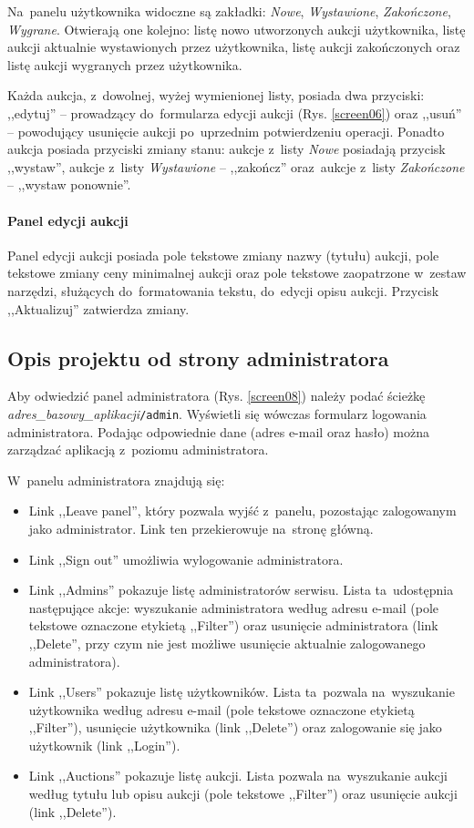 Na~panelu użytkownika widoczne są zakładki: \textit{Nowe}, \textit{Wystawione}, \textit{Zakończone}, \textit{Wygrane}. Otwierają one kolejno: listę nowo utworzonych aukcji użytkownika, listę aukcji aktualnie wystawionych przez użytkownika, listę aukcji zakończonych oraz listę aukcji wygranych przez użytkownika.


Każda aukcja, z~dowolnej, wyżej wymienionej listy, posiada dwa przyciski: ,,edytuj'' -- prowadzący do~formularza edycji aukcji (Rys. \ref{screen06}) oraz ,,usuń'' -- powodujący usunięcie aukcji po~uprzednim potwierdzeniu operacji. Ponadto aukcja posiada przyciski zmiany stanu: aukcje z~listy \textit{Nowe} posiadają przycisk ,,wystaw'', aukcje z~listy \textit{Wystawione} -- ,,zakończ'' oraz~aukcje z~listy \textit{Zakończone} -- ,,wystaw ponownie''.

\paragraph{Panel edycji aukcji}

Panel edycji aukcji posiada pole tekstowe zmiany nazwy (tytułu) aukcji, pole tekstowe zmiany ceny minimalnej aukcji oraz pole tekstowe zaopatrzone w~zestaw narzędzi, służących do~formatowania tekstu, do~edycji opisu aukcji. Przycisk ,,Aktualizuj'' zatwierdza zmiany.

\subsection{Opis projektu od strony administratora}

Aby odwiedzić panel administratora (Rys. \ref{screen08}) należy podać ścieżkę \textit{adres\_bazowy\_aplikacji}\texttt{/admin}. Wyświetli się wówczas formularz logowania administratora. Podając odpowiednie dane (adres e-mail oraz hasło) można zarządzać aplikacją z~poziomu administratora.

W~panelu administratora znajdują się:

\begin{itemize}
  \item Link ,,Leave panel'', który pozwala wyjść z~panelu, pozostając zalogowanym jako administrator. Link ten przekierowuje na~stronę główną.
  \item Link ,,Sign out'' umożliwia wylogowanie administratora.
  \item Link ,,Admins'' pokazuje listę administratorów serwisu. Lista ta~udostępnia następujące akcje: wyszukanie administratora według adresu e-mail (pole tekstowe oznaczone etykietą ,,Filter'') oraz usunięcie administratora (link ,,Delete'', przy czym nie jest możliwe usunięcie aktualnie zalogowanego administratora).
  \item Link ,,Users'' pokazuje listę użytkowników. Lista ta~pozwala na~wyszukanie użytkownika według adresu e-mail (pole tekstowe oznaczone etykietą ,,Filter''), usunięcie użytkownika (link ,,Delete'') oraz zalogowanie się jako użytkownik (link ,,Login'').
  \item Link ,,Auctions'' pokazuje listę aukcji. Lista pozwala na~wyszukanie aukcji według tytułu lub opisu aukcji (pole tekstowe ,,Filter'') oraz usunięcie aukcji (link ,,Delete'').
\end{itemize}

